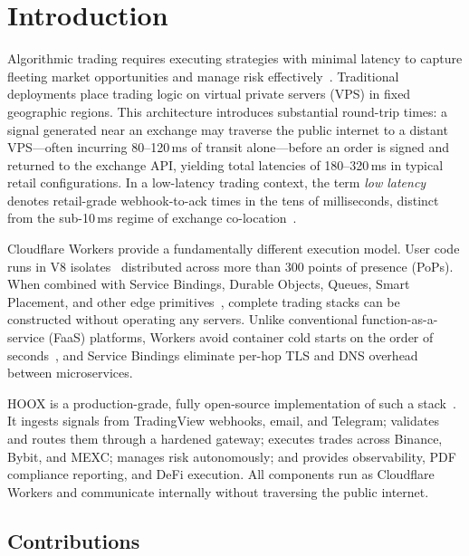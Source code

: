 \section{Introduction}
\label{sec:introduction}

Algorithmic trading requires executing strategies with minimal latency to capture fleeting market opportunities and manage risk effectively~\cite{hasbrouck2007empirical,hendershott2011does,hasbrouck2013lowlatency}. Traditional deployments place trading logic on virtual private servers (VPS) in fixed geographic regions. This architecture introduces substantial round-trip times: a signal generated near an exchange may traverse the public internet to a distant VPS---often incurring 80--120\,ms of transit alone---before an order is signed and returned to the exchange API, yielding total latencies of 180--320\,ms in typical retail configurations. In a low-latency trading context, the term \emph{low latency} denotes retail-grade webhook-to-ack times in the tens of milliseconds, distinct from the sub-10\,ms regime of exchange co-location~\cite{arnold2010latency,budish2015hft}.

Cloudflare Workers provide a fundamentally different execution model. User code runs in V8 isolates~\cite{jonas2019berkeley} distributed across more than 300 points of presence (PoPs). When combined with Service Bindings, Durable Objects, Queues, Smart Placement, and other edge primitives~\cite{cloudflare-workers,cloudflare-service-bindings,cloudflare-durable-objects,cloudflare-queues}, complete trading stacks can be constructed without operating any servers. Unlike conventional function-as-a-service (FaaS) platforms, Workers avoid container cold starts on the order of seconds~\cite{wang2018peeking,lloyd2018serverless}, and Service Bindings eliminate per-hop TLS and DNS overhead between microservices.

\textsc{HOOX} is a production-grade, fully open-source implementation of such a stack~\cite{hoox-project}. It ingests signals from TradingView webhooks, email, and Telegram; validates and routes them through a hardened gateway; executes trades across Binance, Bybit, and MEXC; manages risk autonomously; and provides observability, PDF compliance reporting, and DeFi execution. All components run as Cloudflare Workers and communicate internally without traversing the public internet.

\subsection{Contributions}

